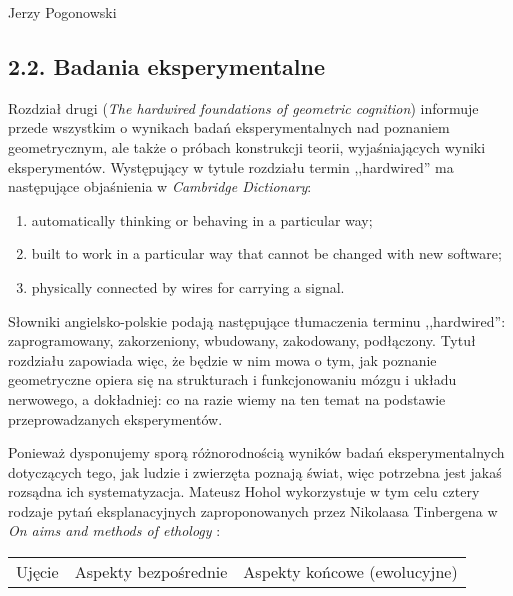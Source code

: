 \begin{newrevengenv}{Jerzy Pogonowski}
\subsection{2.2. Badania eksperymentalne}

Rozdział drugi ({\em The hardwired foundations of geometric
cognition}) informuje przede wszystkim o wynikach badań
eksperymentalnych nad poznaniem geometrycznym, ale także o próbach
konstrukcji teorii, wyjaśniających wyniki eksperymentów.
Występujący w tytule rozdziału termin ,,hardwired'' ma następujące
objaśnienia w {\em Cambridge Dictionary}:

\begin{enumerate}

\item automatically thinking or behaving in a particular way;

\item built to work in a particular way that cannot be changed
with new software;

\item physically connected by wires for carrying a signal.

\end{enumerate}

Słowniki angielsko-polskie podają następujące tłumaczenia terminu
,,hard\-wired'': zaprogramowany, zakorzeniony, wbudowany,
zakodowany, podłączony. Tytuł rozdziału zapowiada więc, że będzie
w nim mowa o tym, jak poznanie geometryczne opiera się na
strukturach i funkcjonowaniu mózgu i układu nerwowego, a
dokładniej: co na razie wiemy na ten temat na podstawie
przeprowadzanych eksperymentów.

Ponieważ dysponujemy sporą różnorodnością wyników badań
eksperymentalnych dotyczących tego, jak ludzie i zwierzęta poznają
świat, więc potrzebna jest jakaś rozsądna ich systematyzacja.
Mateusz Hohol wykorzystuje w tym celu cztery rodzaje pytań
eksplanacyjnych zaproponowanych przez Nikolaasa Tinbergena w \textit{On
aims and methods of ethology} \parencite{tinbergen_aims_1963}:
\begin{center}
\begin{small}
\begin{tabular}{|l|l|l|}

\hline

Ujęcie & Aspekty bezpośrednie & Aspekty końcowe (ewolucyjne)\\


\end{tabular}
\end{small}
\end{center}
\end{newrevengenv}
